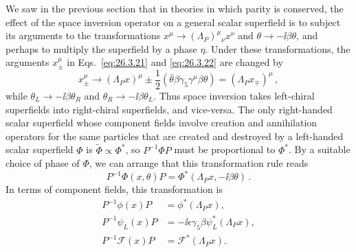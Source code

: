 We saw in the previous section that in theories in which parity is conserved,
the effect of the space inversion operator on a general scalar superfield is
to subject its arguments to the transformations
$x^\mu\rightarrow(\Lambda_P)^\mu{}_\nu x^\nu$ and
$\theta\rightarrow-\ii\beta\theta$, and perhaps to multiply the superfield by a
phase $\eta$. Under these transformations, the arguments $x_\pm^\mu$ in
Eqs.~\eqref{eq:26.3.21} and \eqref{eq:26.3.22} are changed by
\begin{equation}
  x_\pm^\mu\longrightarrow
  (\Lambda_Px)^\mu
  \pm\frac12(\bar\theta\beta\gamma_5\gamma^\mu\beta\theta)
  =(\Lambda_Px_\mp)^\mu\,,
  \tag{26.3.34}\label{eq:26.3.34}
\end{equation}
while $\theta_L\rightarrow-\ii\beta\theta_R$ and
$\theta_R\rightarrow-\ii\beta\theta_L$. Thus space inversion takes left-chiral
superfields into right-chiral superfields, and vice-versa. The only
right-handed scalar superfield whose component fields involve creation and
annihilation operators for the same particles that are created and destroyed
by a left-handed scalar superfield $\Phi$ is
$\widetilde{\Phi}\mathrel{\propto}\Phi^*$, so $P^{-1}\Phi P$ must be
proportional to $\Phi^*$. By a suitable choice of phase of $\Phi$, we can
arrange that this transformation rule reads
\begin{equation}
  P^{-1}\Phi(x,\theta)P
  =\Phi^*(\Lambda_Px,-\ii\beta\theta)\,.
  \tag{26.3.35}\label{eq:26.3.35}
\end{equation}
In terms of component fields, this transformation is
\begin{equation}
  \begin{aligned}
  P^{-1}\phi(x)P&=\phi^*(\Lambda_Px),\\
  P^{-1}\psi_L(x)P&=-\ii\epsilon\gamma_5\beta\psi_L^*(\Lambda_Px),\\
  P^{-1}\mathcal{F}(x)P&=\mathcal{F}^*(\Lambda_Px).
  \end{aligned}
  \tag{26.3.36}\label{eq:26.3.36}
\end{equation}

